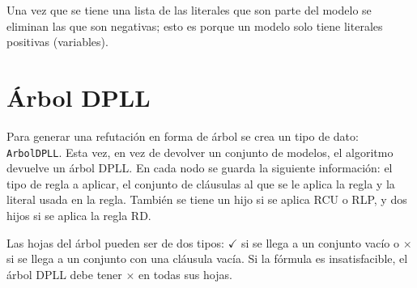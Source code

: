 \documentclass{article}
\begin{document}
Una vez que se tiene una lista de las literales que son parte del modelo se eliminan las que son negativas; esto es porque un modelo solo tiene literales positivas (variables).

\section{Árbol DPLL}

Para generar una refutación en forma de árbol se crea un tipo de dato: \texttt{ArbolDPLL}. Esta vez, en vez de devolver un conjunto de modelos, el algoritmo devuelve un árbol DPLL. En cada nodo se guarda la siguiente información: el tipo de regla a aplicar, el conjunto de cláusulas al que se le aplica la regla y la literal usada en la regla. También se tiene un hijo si se aplica RCU o RLP, y dos hijos si se aplica la regla RD.

Las hojas del árbol pueden ser de dos tipos: $\checkmark$ si se llega a un conjunto vacío o $\times$ si se llega a un conjunto con una cláusula vacía. Si la fórmula es insatisfacible, el árbol DPLL debe tener $\times$ en todas sus hojas.
\end{document}
